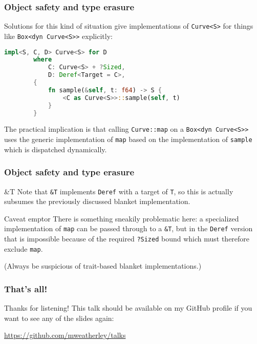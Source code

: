\documentclass[10pt]{beamer}
\begin{document}
\begin{frame}[fragile]
    \frametitle{Object safety and type erasure}
    Solutions for this kind of situation give implementations of \texttt{Curve<S>} for things like \texttt{Box<dyn Curve<S>>} explicitly:
    \begin{lstlisting}[language=Rust, gobble=8]
        impl<S, C, D> Curve<S> for D
        where
            C: Curve<S> + ?Sized,
            D: Deref<Target = C>,
        {
            fn sample(&self, t: f64) -> S {
                <C as Curve<S>>::sample(self, t)
            }
        }
    \end{lstlisting}
    The practical implication is that calling \texttt{Curve::map} on a \texttt{Box<dyn Curve<S>>} uses the generic implementation of \texttt{map} based on the implementation of \texttt{sample} which is dispatched dynamically. 
\end{frame}

\begin{frame}[fragile]
    \frametitle{Object safety and type erasure}
    \begin{block}{\&T}
        Note that \texttt{\&T} implements \texttt{Deref} with a target of \texttt{T}, so this is actually subsumes the previously discussed blanket implementation.
    \end{block}\pause
    \begin{alertblock}{Caveat emptor}
        There is something sneakily problematic here: a specialized implementation of \texttt{map} can be passed through to a \texttt{\&T}, but in the \texttt{Deref} version that is impossible because of the required \verb|?Sized| bound which must therefore exclude \texttt{map}.
    \end{alertblock}\pause
(Always be suspicious of trait-based blanket implementations.)
\end{frame}

\begin{frame}
    \frametitle{That's all!}
    Thanks for listening! This talk should be available on my GitHub profile if you want to see any of the slides again:
    
    
    \url{https://github.com/mweatherley/talks}
\end{frame}
\end{document}
